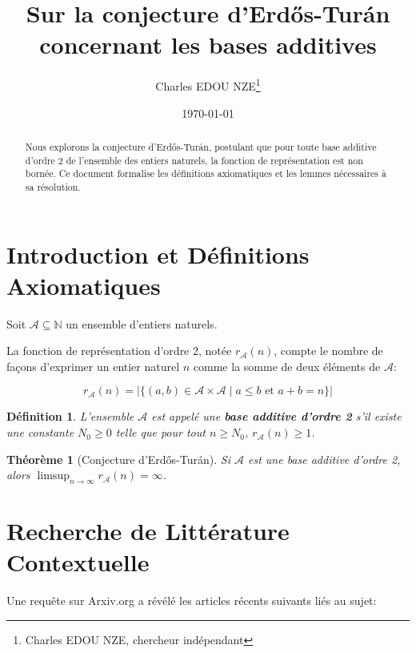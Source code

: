 \documentclass[11pt,a4paper]{article}
\title{Sur la conjecture d'Erd\H{o}s-Tur\'an concernant les bases additives}
\author{Charles EDOU NZE\thanks{Charles EDOU NZE, chercheur ind\'ependant}}
\date{\today}
\newtheorem{theorem}{Th\'eor\`eme}
\newtheorem{definition}{D\'efinition}
\begin{document}
\maketitle

\begin{abstract}
Nous explorons la conjecture d'Erd\H{o}s-Tur\'an, postulant que pour toute base additive d'ordre 2 de l'ensemble des entiers naturels, la fonction de repr\'esentation est non born\'ee. Ce document formalise les d\'efinitions axiomatiques et les lemmes n\'ecessaires \`a sa r\'esolution.
\end{abstract}

\section{Introduction et D\'efinitions Axiomatiques}
Soit $\mathcal{A} \subseteq \mathbb{N}$ un ensemble d'entiers naturels.

La fonction de repr\'esentation d'ordre 2, not\'ee $r_{\mathcal{A}}(n)$, compte le nombre de fa\c{c}ons d'exprimer un entier naturel $n$ comme la somme de deux \'el\'ements de $\mathcal{A}$:

\begin{equation*}
r_{\mathcal{A}}(n) = |\{ (a, b) \in \mathcal{A} \times \mathcal{A} \mid a \le b \text{ et } a + b = n \}|
\end{equation*}

\begin{definition}
L'ensemble $\mathcal{A}$ est appel\'e une \textbf{base additive d'ordre 2} s'il existe une constante $N_0 \ge 0$ telle que pour tout $n \ge N_0$, $r_{\mathcal{A}}(n) \ge 1$.
\end{definition}

\begin{theorem}[Conjecture d'Erd\H{o}s-Tur\'an]
Si $\mathcal{A}$ est une base additive d'ordre 2, alors $\limsup_{n \to \infty} r_{\mathcal{A}}(n) = \infty$.
\end{theorem}

\section{Recherche de Litt\'erature Contextuelle}
Une requ\^ete sur Arxiv.org a r\'ev\'el\'e les articles r\'ecents suivants li\'es au sujet:
\end{document}
